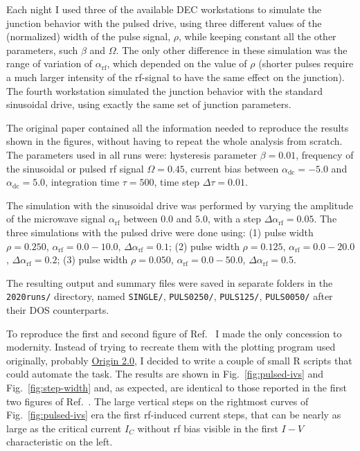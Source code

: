 Each night I used three of the available DEC workstations to simulate the junction behavior with the pulsed drive, using three different values of the (normalized) width of the pulse signal, $\rho$, while keeping constant all the other parameters, such $\beta$ and $\Omega$.
The only other difference in these simulation was the range of variation of $\alpha_\mathrm{rf}$, which depended on the value of $\rho$ (shorter pulses require a much larger intensity of the rf-signal to have the same effect on the junction).
The fourth workstation simulated the junction behavior with the standard sinusoidal drive, using exactly the same set of junction parameters.

The original paper  contained all the information needed to reproduce the results shown in the figures, without having to repeat the whole analysis from scratch. 
The parameters used in all runs were: hysteresis parameter $\beta = 0.01$, frequency of the sinusoidal or pulsed  rf signal $\Omega = 0.45$, current bias between $\alpha_\mathrm{dc} = -5.0$ and $\alpha_\mathrm{dc} = 5.0$, integration time $\tau = 500$, time step $\Delta \tau = 0.01$. 

The simulation with the sinusoidal drive was performed by varying the amplitude of the microwave signal $\alpha_\mathrm{rf}$ between $0.0$ and $5.0$, with a step $\Delta \alpha_\mathrm{rf} = 0.05$.
The three simulations with the pulsed drive were done using: 
(1) pulse width $\rho = 0.250$, $\alpha_\mathrm{rf} = 0.0 - 10.0$, $\Delta \alpha_\mathrm{rf} = 0.1$;
(2) pulse width $\rho = 0.125$, $\alpha_\mathrm{rf} = 0.0 - 20.0$, $\Delta \alpha_\mathrm{rf} = 0.2$;
(3) pulse width $\rho = 0.050$, $\alpha_\mathrm{rf} = 0.0 - 50.0$, $\Delta \alpha_\mathrm{rf} = 0.5$.

The resulting output and summary files were saved in separate folders in the \texttt{2020runs/} directory, named \texttt{SINGLE/}, \texttt{PULS0250/}, \texttt{PULS125/}, \texttt{PULS0050/} after their DOS counterparts.

To reproduce the first and second figure of Ref.~\cite{Maggi:1996} I made the only concession to modernity. Instead of trying to recreate them with the plotting program used originally, probably \href{https://www.originlab.com}{Origin 2.0}, I decided to write a couple of small R scripts that could automate the task.
The results are shown in Fig.~\ref{fig:pulsed-ivs} and Fig.~\ref{fig:step-width} and, as expected, are identical to those reported in the first two figures of Ref.~\cite{Maggi:1996}. 
The large vertical steps on the rightmost curves of Fig.~\ref{fig:pulsed-ivs} era the first rf-induced current steps, that can be nearly as large as the critical current $I_C$ without rf bias visible in the first $I - V$ characteristic on the left.

